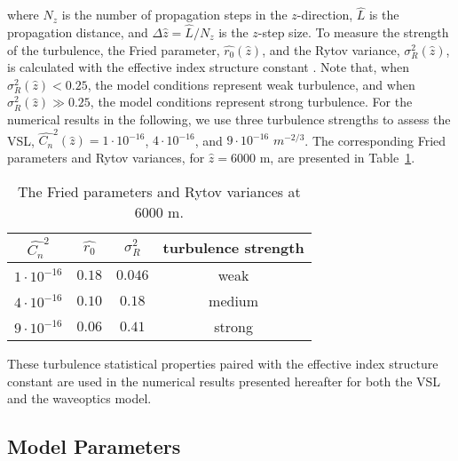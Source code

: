 \documentclass[9pt,twocolumn,twoside]{osajnl}
\begin{document}
where $N_{z}$ is the number of propagation steps in the $z$-direction, $\widehat{L}$ is the propagation distance, 
and $\Delta \widehat{z} = \widehat{L}/N_{z}$ is the $z$-step size. 
To measure the strength of the turbulence, the Fried parameter, $\widehat{r_{0}}(\widehat{z})$, and the Rytov variance, 
$\sigma_{R}^2(\widehat{z})$, is calculated with the effective index structure constant \cite{NumSimOpticalWaveProp}. 
Note that, when $\sigma_{R}^2(\widehat{z}) < 0.25$, the model conditions represent weak turbulence, and when $\sigma_{R}^2(\widehat{z}) \gg 0.25$, 
the model conditions represent strong turbulence.  
For the numerical results in the following, we use three turbulence strengths to assess the VSL, 
$\widehat{C_n}^2(\widehat{z}) = 1\cdot 10^{-16}$, $4\cdot 10^{-16}$, and $9\cdot 10^{-16}$ $m^{-2/3}$. 
The corresponding Fried parameters and Rytov variances, for $\widehat{z} = 6000$ m, are presented in Table~\ref{tab:turbulencestrength}.
\begin{table}[htp]
    \centering \vspace*{-3mm}
    \caption{The Fried parameters and Rytov variances at $6000$ m.}
    \label{tab:turbulencestrength}
    \begin{tabular}{c c c c}
    \hline
         $\widehat{C_n}^2$ & $\widehat{r_0}$ & $\sigma_R^2$ & turbulence strength\\
         \hline
         $1\cdot 10^{-16}$ & $0.18$ & $0.046$ & weak \\
         $4\cdot 10^{-16}$ & $0.10$ & $0.18$ & medium \\
         $9\cdot 10^{-16}$ & $0.06$ & $0.41$ & strong\\
         \hline
    \end{tabular}

\end{table}

These turbulence statistical properties paired with the effective index structure constant are used in the 
numerical results presented hereafter for both the VSL and the waveoptics model.



\vspace*{-3mm}
\subsection{Model Parameters}
\end{document}
